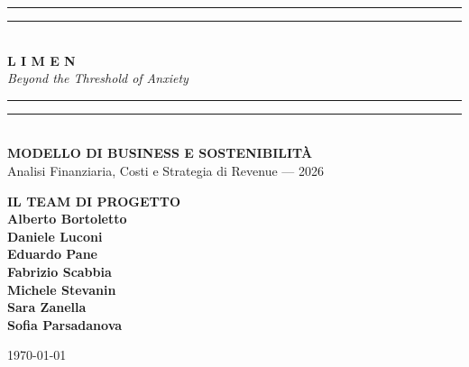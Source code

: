 \documentclass[12pt,a4paper]{article}
\begin{document}
\begin{titlepage}
    \centering
    \vspace*{1cm}
    
    \rule{\textwidth}{1.6pt}\vspace*{-\baselineskip}\vspace*{2pt}
    \rule{\textwidth}{0.4pt}\\[\baselineskip]
    
    {\Huge \textbf{\color{LimenDeep} L I M E N}} \\
    \vspace{0.5cm}
    {\Large \textit{Beyond the Threshold of Anxiety}} \\
    
    \rule{\textwidth}{0.4pt}\vspace*{-\baselineskip}\vspace*{2pt}
    \rule{\textwidth}{1.6pt}\\[2cm]
    
    {\Large \textbf{MODELLO DI BUSINESS E SOSTENIBILITÀ}} \\
    \vspace{0.5cm}
    {\large Analisi Finanziaria, Costi e Strategia di Revenue --- 2026} \\
    
    \vfill

    \begin{minipage}{0.8\textwidth}
        \centering
        \textbf{\large IL TEAM DI PROGETTO} \\
        \vspace{0.5cm}
            \textbf{Alberto Bortoletto} \\
            \textbf{Daniele Luconi} \\
            \textbf{Eduardo Pane} \\
            \textbf{Fabrizio Scabbia} \\
            \textbf{Michele Stevanin} \\
            \textbf{Sara Zanella} \\            
            \textbf{Sofia Parsadanova} \\
    \end{minipage}

    \vfill
    {\large \today}
\end{titlepage}

\newpage
\tableofcontents
\newpage
\end{document}
